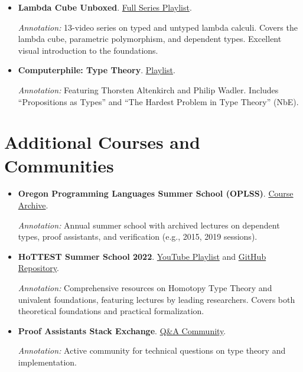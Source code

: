 \documentclass[11pt]{article}
\begin{document}
\begin{itemize}[leftmargin=*]
\item \textbf{Lambda Cube Unboxed}. \href{https://www.youtube.com/watch?v=233A3bN0UBE&list=PLNwzBl6BGLwOKBFVbvp-GFjAA_ESZ--q4}{Full Series Playlist}.

\textit{Annotation:} 13-video series on typed and untyped lambda calculi. Covers the lambda cube, parametric polymorphism, and dependent types. Excellent visual introduction to the foundations.

\item \textbf{Computerphile: Type Theory}. \href{https://www.youtube.com/playlist?list=PL3XL6suc7Hp70kLZVUImSDYXd4GE_E8Ys}{Playlist}.

\textit{Annotation:} Featuring Thorsten Altenkirch and Philip Wadler. Includes ``Propositions as Types'' and ``The Hardest Problem in Type Theory'' (NbE).
\end{itemize}

\section{Additional Courses and Communities}

\begin{itemize}[leftmargin=*]
\item \textbf{Oregon Programming Languages Summer School (OPLSS)}. \href{https://www.cs.uoregon.edu/research/summerschool/}{Course Archive}.

\textit{Annotation:} Annual summer school with archived lectures on dependent types, proof assistants, and verification (e.g., 2015, 2019 sessions).

\item \textbf{HoTTEST Summer School 2022}. \href{https://www.youtube.com/watch?v=fJxWLQaaCX4&list=PLlSe3Yl8WZcdXJBYBVbkXMJMWfBvl5iRs}{YouTube Playlist} and \href{https://github.com/martinescardo/HoTTEST-Summer-School}{GitHub Repository}.

\textit{Annotation:} Comprehensive resources on Homotopy Type Theory and univalent foundations, featuring lectures by leading researchers. Covers both theoretical foundations and practical formalization.

\item \textbf{Proof Assistants Stack Exchange}. \href{https://proofassistants.stackexchange.com/}{Q\&A Community}.

\textit{Annotation:} Active community for technical questions on type theory and implementation.
\end{itemize}
\end{document}
